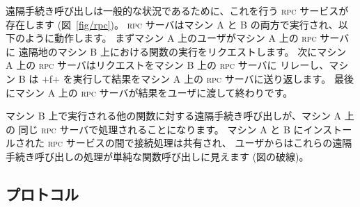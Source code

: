 遠隔手続き呼び出しは一般的な状況であるために、これを行う \textsc{rpc} サービスが
存在します (図~\ref{fig/rpc})。
\textsc{rpc} サーバはマシン A と B の両方で実行され、以下のように動作します。
まずマシン A 上のユーザがマシン A 上の \textsc{rpc} サーバに
遠隔地のマシン B 上における関数の実行をリクエストします。
次にマシン A 上の \textsc{rpc} サーバはリクエストをマシン B 上の \textsc{rpc} サーバに
リレーし、マシン B は \ml+f+ を実行して結果をマシン A 上の  \textsc{rpc} サーバに送り返します。
最後にマシン A 上の \textsc{rpc} サーバが結果をユーザに渡して終わりです。

マシン B 上で実行される他の関数に対する遠隔手続き呼び出しが、マシン A 上の
同じ \textsc{rpc} サーバで処理されることになります。
マシン A と B にインストールされた \textsc{rpc} サービスの間で接続処理は共有され、
ユーザからはこれらの遠隔手続き呼び出しの処理が単純な関数呼び出しに見えます (図の破線)。

\subsection*{ プロトコル}

